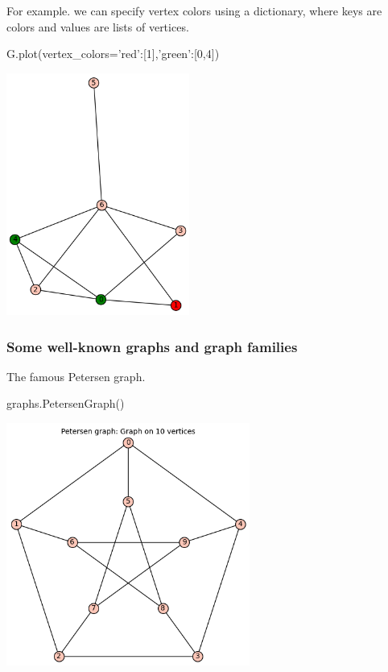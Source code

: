 \medskip
For example. we can specify vertex colors using a dictionary, where keys are colors and values are lists of vertices.
\begin{sageCell}
    G.plot(vertex_colors={'red':[1],'green':[0,4]})
\end{sageCell}
\begin{outImage}
    \includegraphics[width=6cm]{Images/Introduction/output_96_1.png}
\end{outImage}

\subsubsection{Some well-known graphs and graph families}

The famous Petersen graph.
\begin{sageCell}
    graphs.PetersenGraph()
\end{sageCell}
\begin{outImage}
    \includegraphics[width=8cm]{Images/Introduction/output_petersen.png}
\end{outImage}

